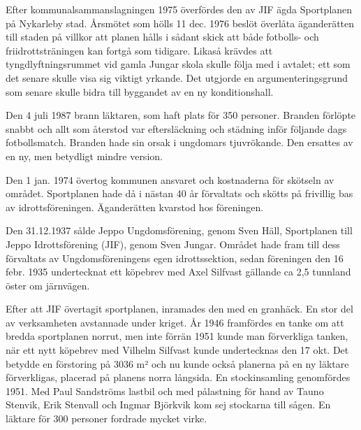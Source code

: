 


Efter kommunalsammanslagningen 1975 överfördes den av JIF ägda Sportplanen på Nykarleby stad. Årsmötet som hölls 11 dec. 1976 beslöt överlåta äganderätten till staden på villkor att planen hålls i sådant skick  att både fotbolls- och friidrottsträningen kan fortgå som tidigare. Likaså krävdes att tyngdlyftningsrummet vid gamla Jungar skola skulle följa med i avtalet; ett som det senare skulle visa sig viktigt yrkande. Det utgjorde en argumenteringsgrund som senare skulle bidra till byggandet av en ny konditionshall.

Den 4 juli 1987 brann läktaren, som  haft plats för 350 personer. Branden förlöpte snabbt och allt som återstod var eftersläckning och städning inför följande dags fotbollsmatch. Branden hade sin orsak i ungdomars tjuvrökande. Den ersattes av en ny, men betydligt mindre version.


Den 1 jan. 1974 övertog kommunen ansvaret och kostnaderna för skötseln av området. Sportplanen hade då i nästan 40 år förvaltats och skötts på frivillig bas av idrottsföreningen. Äganderätten kvarstod hos föreningen.\jhvspace{}


Den 31.12.1937 sålde Jeppo Ungdomsförening, genom Sven Häll, Sportplanen till Jeppo Idrottsförening (JIF), genom Sven Jungar. Området hade fram till dess förvaltats av Ungdomsföreningens egen idrottssektion, sedan föreningen den 16 febr. 1935 undertecknat ett köpebrev med Axel Silfvast gällande ca 2,5 tunnland öster om järnvägen.

Efter att JIF övertagit sportplanen, inramades den med en granhäck. En stor del av verksamheten avstannade under kriget. År 1946 framfördes  en tanke om att bredda sportplanen norrut, men inte förrän 1951 kunde man förverkliga tanken, när ett nytt köpebrev med Vilhelm Silfvast kunde undertecknas den 17 okt. Det betydde en förstoring på 3036 m² och nu kunde också planerna på en ny läktare förverkligas, placerad på planens norra långsida. En stockinsamling genomfördes 1951. Med Paul Sandströms lastbil och med pålastning för hand av Tauno Stenvik, Erik Stenvall och Ingmar Björkvik kom sej stockarna till sågen. En läktare för 300 personer fordrade mycket virke.

